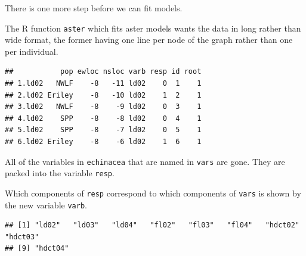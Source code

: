 \documentclass[
  ignorenonframetext,
]{beamer}
\newenvironment{Shaded}{\begin{snugshade}}{\end{snugshade}}
\newcommand{\AttributeTok}[1]{\textcolor[rgb]{0.77,0.63,0.00}{#1}}
\newcommand{\DecValTok}[1]{\textcolor[rgb]{0.00,0.00,0.81}{#1}}
\newcommand{\DocumentationTok}[1]{\textcolor[rgb]{0.56,0.35,0.01}{\textbf{\textit{#1}}}}
\newcommand{\FunctionTok}[1]{\textcolor[rgb]{0.00,0.00,0.00}{#1}}
\newcommand{\NormalTok}[1]{#1}
\newcommand{\OtherTok}[1]{\textcolor[rgb]{0.56,0.35,0.01}{#1}}
\newcommand{\SpecialCharTok}[1]{\textcolor[rgb]{0.00,0.00,0.00}{#1}}
\begin{document}
\begin{frame}[fragile]{}
\protect\hypertarget{section-13}{}
There is one more step before we can fit models.

The R function \texttt{aster} which fits aster models wants the data in
long rather than wide format, the former having one line per node of the
graph rather than one per individual.

\vspace{12pt}
\tiny

\begin{Shaded}
\end{Shaded}

\begin{verbatim}
##           pop ewloc nsloc varb resp id root
## 1.ld02   NWLF    -8   -11 ld02    0  1    1
## 2.ld02 Eriley    -8   -10 ld02    1  2    1
## 3.ld02   NWLF    -8    -9 ld02    0  3    1
## 4.ld02    SPP    -8    -8 ld02    0  4    1
## 5.ld02    SPP    -8    -7 ld02    0  5    1
## 6.ld02 Eriley    -8    -6 ld02    1  6    1
\end{verbatim}
\end{frame}

\begin{frame}[fragile]{}
\protect\hypertarget{section-14}{}
All of the variables in \texttt{echinacea} that are named in
\texttt{vars} are gone. They are packed into the variable \texttt{resp}.

Which components of \texttt{resp} correspond to which components of
\texttt{vars} is shown by the new variable \texttt{varb}.

\vspace{12pt}
\tiny

\begin{Shaded}
\end{Shaded}

\begin{verbatim}
## [1] "ld02"   "ld03"   "ld04"   "fl02"   "fl03"   "fl04"   "hdct02" "hdct03"
## [9] "hdct04"
\end{verbatim}
\end{frame}
\end{document}
